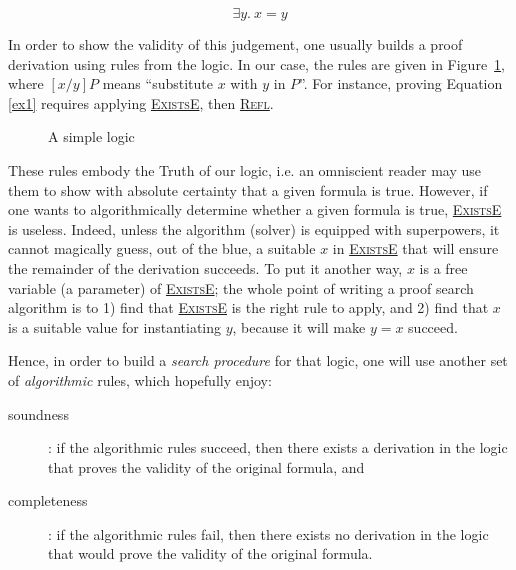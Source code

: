 \documentclass{easychair}
\let\TirName\textsc
\renewcommand{\DefTirName}[1]{\hyperlink{#1}{\TirName {#1}}}
\let\Rule\DefTirName
\newcommand{\fref}[1]{Figure~\ref{fig:#1}}
\begin{document}
\begin{equation}
  \exists y.\ x = y
  \label{ex1}
\end{equation}

In order to show the validity of this judgement, one usually builds a proof
derivation using rules from the logic. In our case, the rules are given in
\fref{logic}, where $[x/y]P$ means ``substitute $x$ with $y$ in $P$''. For
instance, proving Equation \ref{ex1} requires applying \Rule{ExistsE}, then
\Rule{Refl}.

\begin{figure}
  \centering
  \begin{mathpar}


  \end{mathpar}
  \caption{A simple logic}
  \label{fig:logic}
\end{figure}

These rules embody the Truth of our logic, i.e. an omniscient reader may use
them to show with absolute certainty that a given formula is true.
%
However, if one wants to algorithmically determine whether a given formula is
true, \Rule{ExistsE} is useless. Indeed, unless the algorithm (solver) is
equipped with superpowers, it cannot magically guess, out of the blue, a
suitable $x$ in \Rule{ExistsE} that will ensure the remainder of the derivation
succeeds. To put it another way, $x$ is a free variable (a parameter) of
\Rule{ExistsE}; the whole point of writing a proof search algorithm is to 1)
find that \Rule{ExistsE} is the right rule to apply, and 2) find that $x$ is a
suitable value for instantiating $y$, because it will make $y = x$ succeed.

Hence, in order to build a \emph{search procedure} for that logic, one will
use another set of \emph{algorithmic} rules, which hopefully enjoy:
\begin{description}
  \item[soundness]: if the algorithmic rules succeed, then there exists a
    derivation in the logic that proves the validity of the original formula,
    and
  \item[completeness]: if the algorithmic rules fail, then there exists no
    derivation in the logic that would prove the validity of the original
    formula.
\end{description}
\end{document}
